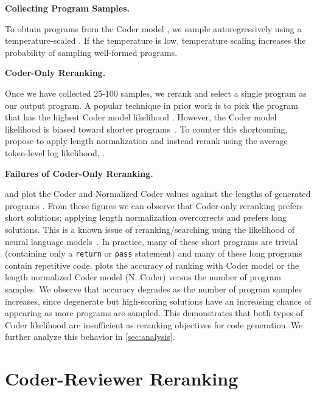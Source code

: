 \documentclass[nohyperref]{article}
\theoremstyle{plain}
\theoremstyle{definition}
\theoremstyle{remark}
\renewcommand{\paragraph}[1]{
     \textbf{#1} 
 }
\begin{document}
\paragraph{Collecting Program Samples.}
To obtain programs from the Coder model , we sample autoregressively using a temperature-scaled .
 If the temperature is low, temperature scaling increases the probability of sampling well-formed programs.

\paragraph{Coder-Only Reranking.}
Once we have collected 25-100 samples, we rerank and select a single program as our output program.
A popular technique in prior work \citep{codex} is to pick the program  that has the highest Coder model likelihood .
However, the Coder model likelihood  is biased toward shorter programs~\citep{stahlberg2019nmt}.
To counter this shortcoming, \citet{codex} propose to apply length normalization and instead rerank using the average token-level log likelihood, .

\paragraph{Failures of Coder-Only Reranking.}
 and  plot the Coder  and Normalized Coder  values against the lengths of generated programs .
From these figures we can observe that Coder-only reranking prefers short solutions; applying length normalization overcorrects and prefers long solutions.
This is a known issue of reranking/searching using the likelihood of neural language models~\citep{curious-case,stahlberg2019nmt}.
In practice, many of these short programs are trivial (\eg containing only a \texttt{return} or \texttt{pass} statement) and many of these long programs contain repetitive code.  plots the accuracy of ranking with Coder model or the length normalized Coder model (N. Coder) versus the number of program samples.
We observe that accuracy degrades as the number of program samples increases, since degenerate but high-scoring solutions have an increasing chance of appearing as more programs are sampled.
This demonstrates that both types of Coder likelihood are insufficient as reranking objectives for code generation.
We further analyze this behavior in \cref{sec:analysis}.

\section{Coder-Reviewer Reranking}
\label{sec:coder-reviewer}
\end{document}
